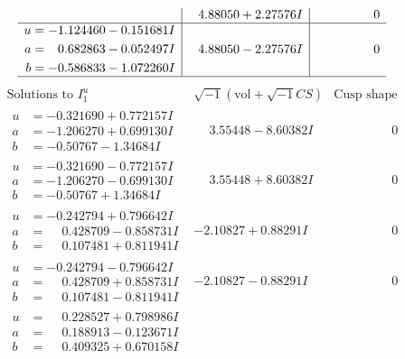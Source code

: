 \documentclass[1p]{elsarticle_modified}
\theoremstyle{definition}
\newcommand{\I}{\sqrt{-1}}
\begin{document}
$$\begin{array}{c|c|c}
 & \phantom{-}4.88050 + 2.27576 I & \phantom{-0.000000 } 0 \\ \hline\begin{aligned}
u &= -1.124460 - 0.151681 I \\
a &= \phantom{-}0.682863 - 0.052497 I \\
b &= -0.586833 - 1.072260 I\end{aligned}
 & \phantom{-}4.88050 - 2.27576 I & \phantom{-0.000000 } 0\\
 \hline 
 \end{array}$$\newpage$$\begin{array}{c|c|c}  
\text{Solutions to }I^u_{1}& \I (\text{vol} + \sqrt{-1}CS) & \text{Cusp shape}\\
 \hline 
\begin{aligned}
u &= -0.321690 + 0.772157 I \\
a &= -1.206270 + 0.699130 I \\
b &= -0.50767 - 1.34684 I\end{aligned}
 & \phantom{-}3.55448 - 8.60382 I & \phantom{-0.000000 } 0 \\ \hline\begin{aligned}
u &= -0.321690 - 0.772157 I \\
a &= -1.206270 - 0.699130 I \\
b &= -0.50767 + 1.34684 I\end{aligned}
 & \phantom{-}3.55448 + 8.60382 I & \phantom{-0.000000 } 0 \\ \hline\begin{aligned}
u &= -0.242794 + 0.796642 I \\
a &= \phantom{-}0.428709 - 0.858731 I \\
b &= \phantom{-}0.107481 + 0.811941 I\end{aligned}
 & -2.10827 + 0.88291 I & \phantom{-0.000000 } 0 \\ \hline\begin{aligned}
u &= -0.242794 - 0.796642 I \\
a &= \phantom{-}0.428709 + 0.858731 I \\
b &= \phantom{-}0.107481 - 0.811941 I\end{aligned}
 & -2.10827 - 0.88291 I & \phantom{-0.000000 } 0 \\ \hline\begin{aligned}
u &= \phantom{-}0.228527 + 0.798986 I \\
a &= \phantom{-}0.188913 - 0.123671 I \\
b &= \phantom{-}0.409325 + 0.670158 I\end{aligned}

\end{array}$$
\end{document}
